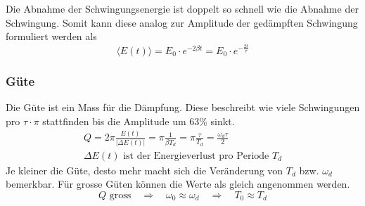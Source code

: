 Die Abnahme der Schwingungsenergie ist doppelt so schnell wie die Abnahme 
der Schwingung. Somit kann diese analog zur Amplitude der gedämpften 
Schwingung formuliert werden als
\[ \boxed{ \langle E(t) \rangle 
	= E_0 \cdot e^{-2 \beta t} = E_0 \cdot e^{-\frac{2 t}{\tau}}
}\]

\subsubsection{Güte}
Die Güte ist ein Mass für die Dämpfung. Diese beschreibt wie viele 
Schwingungen pro $\tau \cdot \pi$ stattfinden bis die Amplitude um 
63\% sinkt.
\[ \begin{array}{l} 
	\boxed{ Q	
		= 2\pi \frac{E(t)}{|\Delta E(t)|}
		= \pi \frac{1}{\beta T_d}
		= \pi \frac{\tau}{T_d}
		= \frac{\omega_d \tau}{2} 
	} \\
	\Delta E(t) \text{ ist der Energieverlust pro Periode } T_d
\end{array} \]
Je kleiner die Güte, desto mehr macht sich die Veränderung von $T_d$
bzw. $\omega_d$ bemerkbar. Für grosse Güten können die Werte als
gleich angenommen werden.
\[ \boxed{ Q \text{ gross} 
	\quad \Rightarrow \quad \omega_0 \approx  \omega_d
	\quad \Rightarrow \quad  T_0 \approx T_d
} \]
